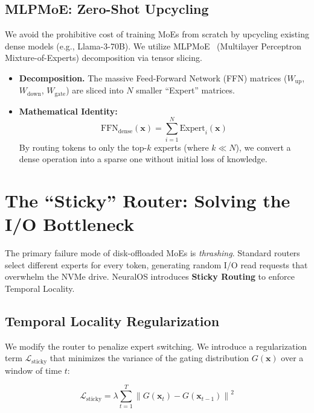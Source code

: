 \documentclass[11pt,twocolumn]{article}
\begin{document}
\subsection{MLPMoE: Zero-Shot Upcycling}

We avoid the prohibitive cost of training MoEs from scratch by upcycling existing dense models (e.g., Llama-3-70B). We utilize MLPMoE~\cite{zhang2022moefication} (Multilayer Perceptron Mixture-of-Experts) decomposition via tensor slicing.

\begin{itemize}
    \item \textbf{Decomposition.} The massive Feed-Forward Network (FFN) matrices ($W_{\text{up}}$, $W_{\text{down}}$, $W_{\text{gate}}$) are sliced into $N$ smaller ``Expert'' matrices.

    \item \textbf{Mathematical Identity:}
    \begin{equation}
        \text{FFN}_{\text{dense}}(\mathbf{x}) = \sum_{i=1}^{N} \text{Expert}_i(\mathbf{x})
        \label{eq:ffn-decomposition}
    \end{equation}
    By routing tokens to only the top-$k$ experts (where $k \ll N$), we convert a dense operation into a sparse one without initial loss of knowledge.
\end{itemize}

\section{The ``Sticky'' Router: Solving the I/O Bottleneck}

The primary failure mode of disk-offloaded MoEs is \emph{thrashing}. Standard routers select different experts for every token, generating random I/O read requests that overwhelm the NVMe drive. NeuralOS introduces \textbf{Sticky Routing} to enforce Temporal Locality.

\subsection{Temporal Locality Regularization}

We modify the router to penalize expert switching. We introduce a regularization term $\mathcal{L}_{\text{sticky}}$ that minimizes the variance of the gating distribution $G(\mathbf{x})$ over a window of time $t$:

\begin{equation}
    \mathcal{L}_{\text{sticky}} = \lambda \sum_{t=1}^{T} \left\| G(\mathbf{x}_t) - G(\mathbf{x}_{t-1}) \right\|^2
    \label{eq:stickiness}
\end{equation}
\end{document}
